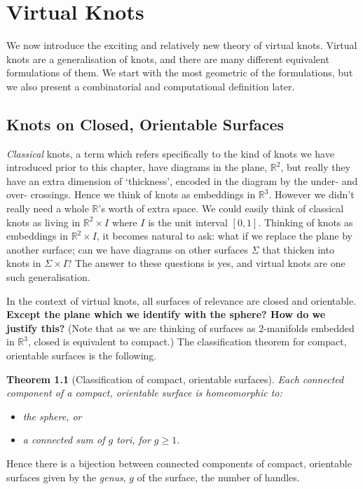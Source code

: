 \documentclass[12pt]{report}
\newcommand{\R}{\mathbb{R}}
\newcommand{\notered}[1]{{\color{Red} \textbf{#1}}}
\newtheorem*{theorem}{Theorem}
\begin{document}
\chapter{Virtual Knots}


We now introduce the exciting and relatively new theory of virtual knots. Virtual knots are a generalisation of knots, and there are many different equivalent formulations of them. We start with the most geometric of the formulations, but we also present a combinatorial and computational definition later.


\section{Knots on Closed, Orientable Surfaces}

\textit{Classical} knots, a term which refers specifically to the kind of knots we have introduced prior to this chapter, have diagrams in the plane, $\R^{2}$, but really they have an extra dimension of `thickness', encoded in the diagram by the under- and over- crossings. Hence we think of knots as embeddings in $\R^{3}$. However we didn't really need a whole $\R$'s worth of extra space. We could easily think of classical knots as living in $\R^{2} \times I$ where $I$ is the unit interval $[0, 1]$. Thinking of knots as embeddings in $\R^{2} \times I$, it becomes natural to ask: what if we replace the plane by another surface; can we have diagrams on other surfaces $\Sigma$ that thicken into knots in $\Sigma \times I$? The answer to these questions is yes, and virtual knots are one such generalisation.

In the context of virtual knots, all surfaces of relevance are closed and orientable. \notered{Except the plane which we identify with the sphere? How do we justify this?} (Note that as we are thinking of surfaces as $2$-manifolds embedded in $\R^{3}$, closed is equivalent to compact.) The classification theorem for compact, orientable surfaces is the following.

\begin{theorem}[Classification of compact, orientable surfaces]
Each connected component of a compact, orientable surface is homeomorphic to:
\begin{itemize}
\item the sphere, or
\item a connected sum of $g$ tori, for $g \geq 1$.
\end{itemize}
\end{theorem}
Hence there is a bijection between connected components of compact, orientable surfaces given by the \textit{genus}, $g$ of the surface, the number of handles.
\end{document}
